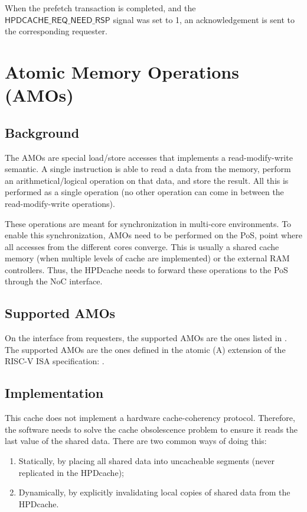 \documentclass[10pt,titlepage,twoside]{book}
\begin{document}
When the prefetch transaction is completed, and the $\mathsf{HPDCACHE\_REQ\_NEED\_RSP}$ signal was set to 1, an acknowledgement is sent to the corresponding requester.


\chapter{Atomic Memory Operations (AMOs)}
\minitoc
\newpage

\section{Background}

The \acp{AMO} are special load/store accesses that implements a read-modify-write semantic.
A single instruction is able to read a data from the memory, perform an arithmetical/logical operation on that data, and store the result.
All this is performed as a single operation (no other operation can come in between the read-modify-write operations).

These operations are meant for synchronization in multi-core environments.
To enable this synchronization, \acp{AMO} need to be performed on the \acf{PoS}, point where all accesses from the different cores converge.
This is usually a shared cache memory (when multiple levels of cache are implemented) or the external RAM controllers.
Thus, the \ac{HPDcache} needs to forward these operations to the \ac{PoS} through the \ac{NoC} interface.

\section{Supported \acp*{AMO}}

On the interface from requesters, the supported \acp{AMO} are the ones listed in .
The supported \acp{AMO} are the ones defined in the atomic (A) extension of the RISC-V ISA specification: \cite{RISCV_spec}.


\section{Implementation}

This cache does not implement a hardware cache-coherency protocol.
Therefore, the software needs to solve the cache obsolescence problem to ensure it reads the last value of the shared data.
There are two common ways of doing this:
\begin{enumerate}
\item Statically, by placing all shared data into uncacheable segments (never replicated in the \ac{HPDcache});

\item Dynamically, by explicitly invalidating local copies of shared data from the \ac{HPDcache}.
\end{enumerate}
\end{document}
